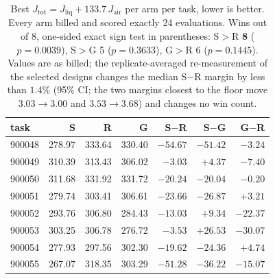 \documentclass{article}
\newcommand{\Jliq}{J_{\mathrm{liq}}}
\newcommand{\Jair}{J_{\mathrm{air}}}
\newcommand{\Jtot}{J_{\mathrm{tot}}}
\begin{document}
\begin{table}[!t]
\centering
\footnotesize
\setlength{\tabcolsep}{3pt}
\begin{tabular}{lrrrrrr}
\toprule
task & S & R & G & S$-$R & S$-$G & G$-$R \\
\midrule
900048 & 278.97 & 333.64 & 330.40 & $-54.67$ & $-51.42$ & $-3.24$ \\
900049 & 310.39 & 313.43 & 306.02 & $-3.03$ & $+4.37$ & $-7.40$ \\
900050 & 311.68 & 331.92 & 331.72 & $-20.24$ & $-20.04$ & $-0.20$ \\
900051 & 279.74 & 303.41 & 306.61 & $-23.66$ & $-26.87$ & $+3.21$ \\
900052 & 293.76 & 306.80 & 284.43 & $-13.03$ & $+9.34$ & $-22.37$ \\
900053 & 303.25 & 306.78 & 276.72 & $-3.53$ & $+26.53$ & $-30.07$ \\
900054 & 277.93 & 297.56 & 302.30 & $-19.62$ & $-24.36$ & $+4.74$ \\
900055 & 267.07 & 318.35 & 303.29 & $-51.28$ & $-36.22$ & $-15.07$ \\
\bottomrule
\end{tabular}
\caption{Best $\Jtot = \Jliq + 133.7\,\Jair$ per arm per task, lower is better.
Every arm billed and scored exactly 24 evaluations.  Wins out of 8, one-sided
exact sign test in parentheses: S$>$R \textbf{8} ($p = 0.0039$), S$>$G 5
($p = 0.3633$), G$>$R 6 ($p = 0.1445$).  Values are as billed; the
replicate-averaged re-measurement of the selected designs changes the median
S$-$R margin by less than $1.4\%$ (95\% CI; the two margins closest to the floor
move $3.03 \to 3.00$ and $3.53 \to 3.68$) and changes no win count.}
\label{tab:e11b}
\end{table}

\begin{table}[!t]
\centering
\footnotesize
\setlength{\tabcolsep}{2.5pt}
\caption{Sensitivity of the arm ordering to the scalarization weight, recomputed
offline from the stored $(\Jliq, \Jair)$ pairs by \texttt{derive\_review.py}.
$93.1$ and $180.4$ are the two pooled regression estimates that bracket the
exchange rate, derived later in this section; the ordering inverts as $\lambda$
moves across that
range, and S versus R falls from $8/8$ to $3/8$ at the sweep's upper endpoint
($\lambda = 534.8$), which is the count the text cites; the $5/8$ an earlier caption
called the upper endpoint is the $\lambda = 180.4$ column, the inverse-regression end of
the bracket.  The sweep is descriptive and was not used to choose
$\lambda$.}
\label{tab:lambda}
\end{table}
\end{document}
